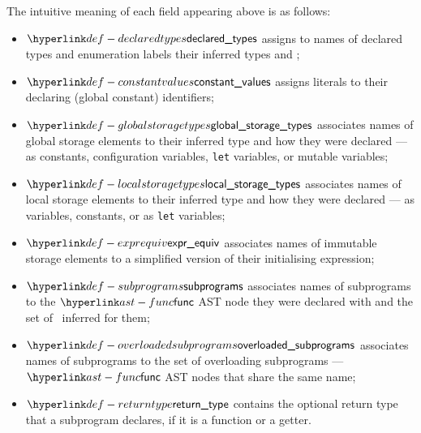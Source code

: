 The intuitive meaning of each field appearing above is as follows:
\begin{itemize}
  \hypertarget{def-declaredtypes}{}
  \item $\declaredtypes$ assigns to names of declared types and enumeration labels their inferred types and \purity{};
  \hypertarget{def-constantvalues}{}
  \item $\constantvalues$ assigns literals to their declaring (global constant) identifiers;
  \hypertarget{def-globalstoragetypes}{}
  \item $\globalstoragetypes$ associates names of global storage elements to their inferred type
  and how they were declared --- as constants, configuration variables, \texttt{let} variables,
  or mutable variables;
  \hypertarget{def-localstoragetypes}{}
  \item $\localstoragetypes$ associates names of local storage elements to their inferred type
  and how they were declared --- as variables, constants, or as \texttt{let} variables;
  \hypertarget{def-exprequiv}{}
  \item $\exprequiv$ associates names of immutable storage elements to a simplified version
  of their initialising expression;
  \hypertarget{def-subprograms}{}
  \item $\subprograms$ associates names of subprograms to the $\func$ AST node they were
  declared with and the set of \sideeffectdescriptorsterm\ inferred for them;
  \hypertarget{def-overloadedsubprograms}{}
  \item $\overloadedsubprograms$ associates names of subprograms to the set of overloading
  subprograms ---  $\func$ AST nodes that share the same name;
  \hypertarget{def-returntype}{}
  \item $\returntype$ contains the optional return type that a subprogram declares,
        if it is a function or a getter.
\end{itemize}

